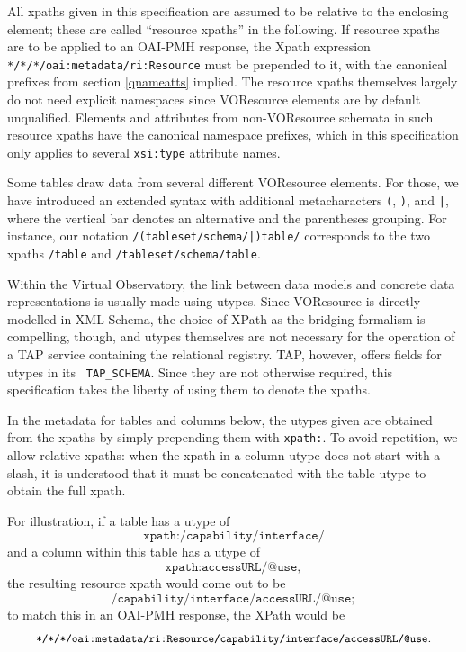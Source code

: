 \documentclass[11pt,a4paper]{ivoa}
\newcommand{\tapent}[1]{\texttt{\color{tapcolor} #1}}
\begin{document}
All xpaths given in this specification are assumed to be relative to
the enclosing  element; these are called
``resource xpaths'' in the following.  If resource xpaths are to be
applied to an OAI-PMH response, the Xpath expression
\texttt{*/*/*/oai:metadata/ri:Resource} must be prepended to it,
with the canonical prefixes from section \ref{qnameatts} implied.  The resource xpaths themselves
largely do not need explicit namespaces since VOResource elements are by
default unqualified.  Elements and attributes from non-VOResource
schemata in such resource xpaths have the canonical namespace prefixes, which in this
specification only applies to several \texttt{xsi:type} attribute
names.

Some tables draw data from several different VOResource elements.
For those, we have introduced an extended syntax with additional
metacharacters \verb$($, \verb$)$, and \verb$|$,
where the vertical bar denotes an
alternative and the parentheses grouping.  For instance, our notation
\texttt{/(tableset/schema/|)table/} corresponds to the two xpaths
\texttt{/table} and \texttt{/tableset/schema/table}.

Within the Virtual Observatory, the link between data models and
concrete data representations is usually made using utypes.
Since VOResource is directly modelled
in XML Schema, the choice of XPath as the bridging formalism is
compelling, though, and utypes themselves are not necessary for the
operation of a TAP service containing the relational registry.
TAP, however, offers fields for utypes in its \tapent{TAP\_SCHEMA}.  Since they
are not otherwise required, this specification takes the liberty of
using them to denote the xpaths.

In the metadata for tables and columns below, the utypes given are
obtained from the xpaths by simply prepending them with
\texttt{xpath:}.  To avoid repetition, we allow relative xpaths:
when the xpath in a column utype does not start with a slash, it is
understood that it must be concatenated with the table utype to obtain
the full xpath.

For illustration, if a table has a utype of
$$\texttt{xpath:/capability/interface/}$$ and a column within this table
has a utype of $$\texttt{xpath:accessURL/@use},$$ the resulting resource
xpath would come out to be
$$\texttt{/capability/interface/accessURL/@use};$$ to match this in an
OAI-PMH response, the XPath would be
$$\texttt{\small
*/*/*/oai:metadata/ri:Resource/capability/interface/accessURL/@use}.$$
\end{document}
